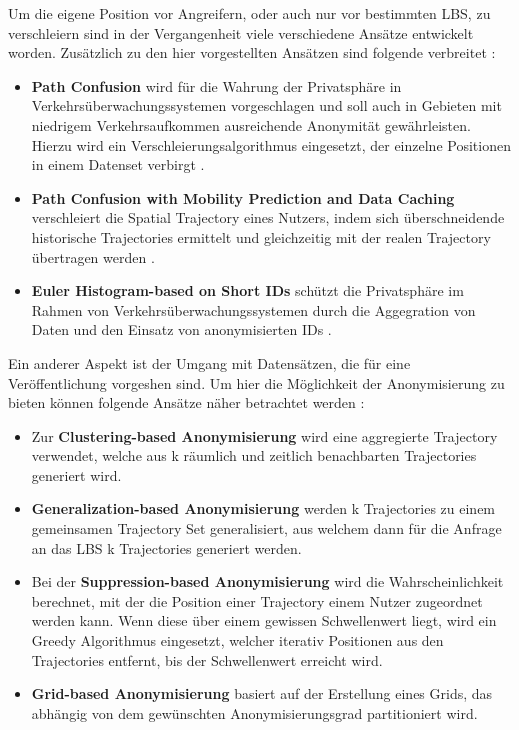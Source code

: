 Um die eigene Position vor Angreifern, oder auch nur vor bestimmten LBS, zu verschleiern sind in der Vergangenheit viele verschiedene Ansätze entwickelt worden. Zusätzlich zu den hier vorgestellten Ansätzen sind folgende verbreitet \cite{Chow2011}:
\begin{itemize}
\item{\textbf{Path Confusion}} wird für die Wahrung der Privatsphäre in Verkehrsüberwachungssystemen vorgeschlagen und soll auch in Gebieten mit niedrigem Verkehrsaufkommen ausreichende Anonymität gewährleisten. Hierzu wird ein Verschleierungsalgorithmus eingesetzt, der einzelne Positionen in einem Datenset verbirgt \cite{Hoh2007}.
\item{\textbf{Path Confusion with Mobility Prediction and Data Caching}} verschleiert die Spatial Trajectory eines Nutzers, indem sich überschneidende historische Trajectories ermittelt und gleichzeitig mit der realen Trajectory übertragen werden \cite{Meyerowitz2009}.
\item{\textbf{Euler Histogram-based on Short IDs}} schützt die Privatsphäre im Rahmen von Verkehrsüberwachungssystemen durch die Aggegration von Daten und den Einsatz von anonymisierten IDs \cite{Xie2010}.
\end{itemize}
Ein anderer Aspekt ist der Umgang mit Datensätzen, die für eine Veröffentlichung vorgeshen sind. Um hier die Möglichkeit der Anonymisierung zu bieten können folgende Ansätze näher betrachtet werden \cite{Chow2011}:
\begin{itemize}
\item {} Zur \textbf{Clustering-based Anonymisierung} wird eine aggregierte Trajectory verwendet, welche aus k räumlich und zeitlich benachbarten Trajectories generiert wird.
\item{\textbf{Generalization-based Anonymisierung}} werden k Trajectories zu einem gemeinsamen Trajectory Set generalisiert, aus welchem dann für die Anfrage an das LBS k Trajectories generiert werden.
\item{} Bei der \textbf{Suppression-based Anonymisierung} wird die Wahrscheinlichkeit berechnet, mit der die Position einer Trajectory einem Nutzer zugeordnet werden kann. Wenn diese über einem gewissen Schwellenwert liegt, wird ein Greedy Algorithmus eingesetzt, welcher iterativ Positionen aus den Trajectories entfernt, bis der Schwellenwert erreicht wird.
\item{\textbf{Grid-based Anonymisierung}} basiert auf der Erstellung eines Grids, das abhängig von dem gewünschten Anonymisierungsgrad partitioniert wird.
\end{itemize}